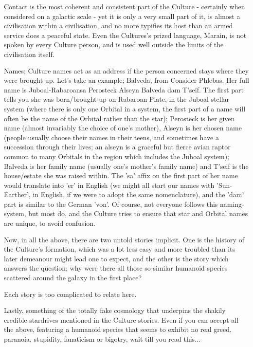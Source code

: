 Contact is the most coherent and consistent part of the Culture - certainly when considered on a galactic scale - yet it is only a very small part of it, is almost a civilisation within a civilisation, and no more typifies its host than an armed service does a peaceful state. Even the Cultures's prized language, Marain, is not spoken by every Culture person, and is used well outside the limits of the civilisation itself.

Names; Culture names act as an address if the person concerned stays where they were brought up. Let's take an example; Balveda, from Consider Phlebas. Her full name is Juboal-Rabaroansa Perosteck Alseyn Balveda dam T'seif. The first part tells you she was born/brought up on Rabaroan Plate, in the Juboal stellar system (where there is only one Orbital in a system, the first part of a name will often be the name of the Orbital rather than the star); Perosteck is her given name (almost invariably the choice of one's mother), Alseyn is her chosen name (people usually choose their names in their teens, and sometimes have a succession through their lives; an alseyn is a graceful but fierce avian raptor common to many Orbitals in the region which includes the Juboal system); Balveda is her family name (usually one's mother's family name) and T'seif is the house/estate she was raised within. The 'sa' affix on the first part of her name would translate into 'er' in English (we might all start our names with 'Sun-Earther', in English, if we were to adopt the same nomenclature), and the 'dam' part is similar to the German 'von'. Of course, not everyone follows this naming-system, but most do, and the Culture tries to ensure that star and Orbital names are unique, to avoid confusion.

Now, in all the above, there are two untold stories implicit. One is the history of the Culture's formation, which was a lot less easy and more troubled than its later demeanour might lead one to expect, and the other is the story which answers the question; why were there all those so-similar humanoid species scattered around the galaxy in the first place?

Each story is too complicated to relate here.

Lastly, something of the totally fake cosmology that underpins the shakily credible stardrives mentioned in the Culture stories. Even if you can accept all the above, featuring a humanoid species that seems to exhibit no real greed, paranoia, stupidity, fanaticism or bigotry, wait till you read this...

